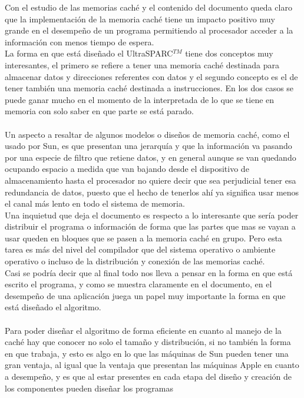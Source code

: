 \documentclass[%
	final,
	notitlepage,
	narroweqnarray,
	inline,
	twoside,
	]{ieee}
\begin{document}
Con el estudio de las memorias caché y el contenido del documento queda claro que
 la implementación de la memoria caché tiene un impacto positivo muy grande en el
 desempeño de un programa permitiendo al procesador acceder a la información con
 menos tiempo de espera.\\ La forma en que está diseñado el UltraSPARC$^{TM}$ tiene
 dos conceptos muy interesantes, el primero se refiere a tener una memoria caché
 destinada para almacenar datos y direcciones referentes con datos y el segundo
 concepto es el de tener también una memoria caché destinada a instrucciones.
 En los dos casos se puede ganar mucho en el momento de la interpretada de lo 
 que se tiene en memoria con solo saber en que parte se está parado.\\\\
Un aspecto a resaltar de algunos modelos o diseños de memoria caché, como el usado
por Sun, es que presentan una jerarquía y que la información va pasando por una 
especie de filtro que retiene datos, y en general aunque se van quedando ocupando
espacio a medida que van bajando desde el dispositivo de almacenamiento hasta el
procesador no quiere decir que sea perjudicial tener esa redundancia de datos, puesto
que el hecho de tenerlos ahí ya significa usar menos el canal más lento en todo el
sistema de memoria.\\
Una inquietud que deja el documento es respecto a lo interesante que sería poder
distribuir el programa o información de forma que las partes que mas se vayan a usar
queden en bloques que se pasen a la memoria caché en grupo. Pero esta tarea es más
del nivel del compilador que del sistema operativo o ambiente operativo o incluso de la
distribución y conexión de las memorias caché.\\
Casi se podría decir que al final todo nos lleva a pensar en la forma en que está escrito
el programa, y como se muestra claramente en el documento, en el desempeño de una
aplicación juega un papel muy importante la forma en que está diseñado el algoritmo.\\\\
Para poder diseñar el algoritmo de forma eficiente en cuanto al manejo de la caché
hay que conocer no solo el tamaño y distribución, si no también la forma en que trabaja, y esto
es algo en lo que las máquinas de Sun pueden tener una gran ventaja, al igual que la ventaja
que presentan las máquinas Apple en cuanto a desempeño, y es que al estar presentes
en cada etapa del diseño y creación de los componentes pueden diseñar los programas
\end{document}

